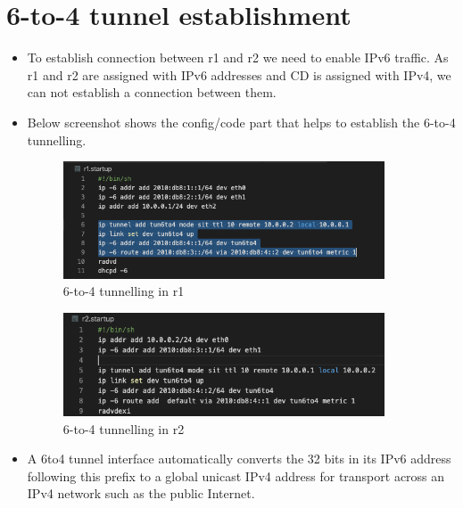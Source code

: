 \section{6-to-4 tunnel establishment}
\begin{itemize}
\item To establish connection between r1 and r2 we need to enable IPv6 traffic. As r1 and r2 are assigned with IPv6 addresses and CD is assigned with IPv4, we can not establish a connection between them.
\item Below screenshot shows the config/code part that helps to establish the 6-to-4 tunnelling.
\begin{figure}[H]
\centering
  \includegraphics[width=0.9\textwidth]{images/6to4Tunnelling_r1.png}
  \caption{6-to-4 tunnelling in r1}
  \label{fig:2.4 }
\end{figure}
\begin{figure}[H]
\centering
  \includegraphics[width=0.9\textwidth]{images/6to4Tunnelling_r2.png}
  \caption{6-to-4 tunnelling in r2}
  \label{fig:2.5}
\end{figure}
\item A 6to4 tunnel interface automatically converts the 32 bits in its IPv6 address following this prefix to a global unicast IPv4 address for transport across an IPv4 network such as the public Internet.
\end{itemize}

